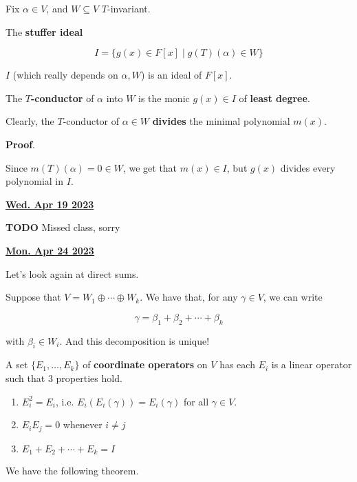 \documentclass[12pt]{article}
\renewcommand{\date}[1]{\underline{\bf #1}}
\def\Tinv{$T$-invariant}
\newcommand{\TODO}{\color{red}\textbf{TODO}\color{black}}
\begin{document}
  Fix $\alpha \in V$, and $W \subseteq V$ \Tinv.

  \Definition{} {
    The {\bf stuffer ideal}

    \[
      I = \{g(x) \in F[x] \mid g(T)(\alpha) \in W\}
    \]

    $I$ (which really depends on $\alpha, W$) is an ideal of $F[x]$.
  }

  \Definition {}
  {
    The {\bf $T$-conductor} of $\alpha$ into $W$ is the monic $g(x) \in I$ of {\bf
    least degree}.
  }

  Clearly, the $T$-conductor of $\alpha \in W$ {\bf divides} the minimal
  polynomial $m(x)$.

  {\bf Proof}.

  Since $m(T)(\alpha) = 0 \in W$, we get that $m(x) \in I$, but $g(x)$ divides
  every polynomial in $I$.

  \date{Wed. Apr 19 2023}

  \TODO{} Missed class, sorry


  \date{Mon. Apr 24 2023}

  Let's look again at direct sums.

  Suppose that $V = W_1 \oplus \cdots \oplus W_k$. We have that, for any $\gamma
  \in V$, we can write

  \[
    \gamma = \beta_1 + \beta_2 + \cdots + \beta_k
  \]

  with $\beta_i \in W_i$. And this decomposition is unique!


  \Definition {} {
    A set $\{E_1, \dots, E_k\}$ of {\bf coordinate operators} on $V$ has each
    $E_i$ is a linear operator such that $3$ properties hold.

    \begin{enumerate}
      \item $E_i^2 = E_i$, i.e. $E_i(E_i(\gamma)) = E_i(\gamma)$ for all $\gamma
        \in V$.

      \item $E_i E_j = 0$ whenever $i \ne j$

      \item $E_1 + E_2 + \cdots + E_k = I$
    \end{enumerate}
  }

  We have the following theorem.
\end{document}
